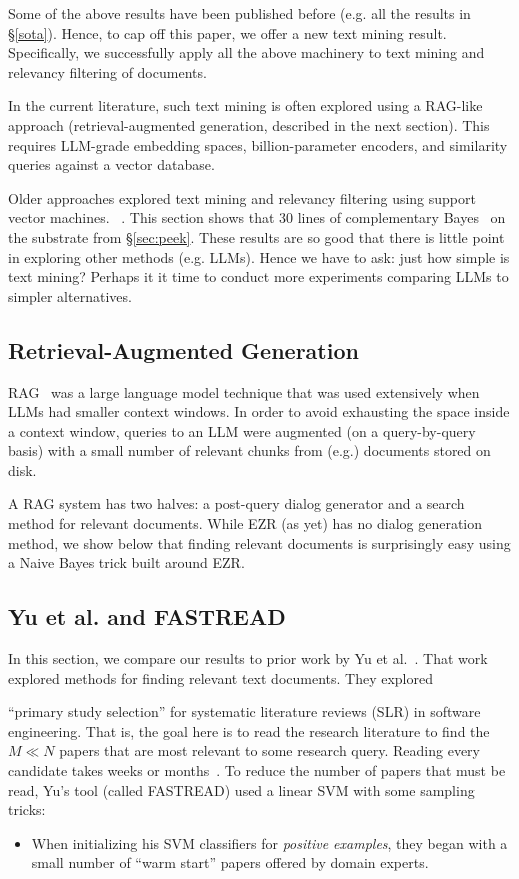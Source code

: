 \documentclass[AMA,STIX2COL]{WileyNJDv5}
\begin{document}
{Some of the above results have been published before (e.g. all the results
in \S\ref{sota}). 
Hence, to cap off this paper,
 we offer a new text mining result. Specifically, we successfully
 apply all the above machinery
 to text mining and relevancy filtering of documents.
 
 In the current literature,  such text mining is often
 explored using a RAG-like approach (retrieval-augmented
 generation, described in the next section). 
This requires LLM-grade embedding spaces, billion-parameter encoders,
and similarity queries against a vector database. 

Older
approaches explored text mining and relevancy filtering using
support vector machines. ~\cite{yu2018total,yu2018finding}. This section shows
that 30 lines of complementary Bayes~\cite{rennie2003tackling}
on the substrate from \S\ref{sec:peek}. These results
are so good  that there is little point
in exploring other methods (e.g. LLMs). Hence we have to ask:
just how simple is text mining? Perhaps it it time
to conduct more experiments
comparing LLMs to simpler alternatives.



 \subsection{Retrieval-Augmented Generation} 
 RAG~\cite{lewis2020rag} was a large language model
 technique that was used extensively when LLMs
 had smaller context
 windows. In order to avoid exhausting the space
 inside a context window,
   queries to an LLM were 
augmented (on a query-by-query basis)
with a small number of relevant chunks
from (e.g.)  documents stored on disk. 

A RAG system has two halves: a post-query dialog generator and a
 search method for relevant documents. While EZR (as yet)
has no dialog generation method, we show below
that finding relevant documents is surprisingly easy using
a Naive Bayes trick built
around EZR.

\subsection{Yu et al. and FASTREAD}

In this section, we compare our results to prior work 
by
Yu et al.~\cite{yu2018total}.
That work
explored methods for 
finding relevant text documents.
They explored  
{``primary study selection'' for
systematic literature reviews (SLR)
in software engineering. 
That is, the goal here is 
to read
the research literature
to find the $M\ll N$
papers that are most relevant
to some research query.
 Reading
every candidate takes weeks or months~\cite{yu2017,yu2018}. 
To reduce the number of papers that must be read, Yu's tool 
(called FASTREAD) used a linear SVM with
some sampling tricks:
\begin{itemize}
\item 
When initializing his SVM classifiers for {\em positive examples},
they began with a small number of ``warm start'' papers offered by domain experts. 


\end{itemize}}}
\end{document}
